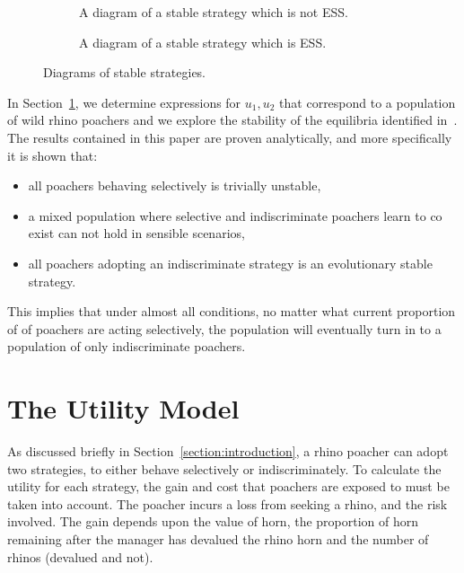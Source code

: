 \documentclass[10pt]{article}
\begin{document}
\begin{figure}[!htbp]
\begin{center}
    \begin{subfigure}{0.40\textwidth}
    
    \caption{\label{fig:stable_diagram} A diagram of a stable strategy which 
    is not ESS.}
    \end{subfigure}
    \begin{subfigure}{0.40\textwidth}
    
    \caption{\label{fig:ess_diagram}A diagram of a stable strategy which is ESS.}
    \end{subfigure}
        \caption{\label{fig:stable_ess_driagrams} Diagrams of stable strategies.}
\end{center}
\end{figure}

In Section~\ref{section:the_model}, we determine expressions
for \(u_1, u_2\) that correspond to a population of wild rhino poachers and we
explore the stability of the equilibria identified in~\cite{Lee}. The results
contained in this paper are proven analytically, and more specifically it is 
shown that:

\begin{itemize}
    \item all poachers behaving selectively is trivially unstable,  
    \item a mixed population where selective and indiscriminate poachers
          learn to co exist can not hold in sensible scenarios,
    \item all poachers adopting an indiscriminate strategy is an evolutionary 
          stable strategy.
\end{itemize}

This implies that under almost all conditions, no matter what current proportion 
of
of poachers are acting selectively, the population will eventually turn in to a 
population of only indiscriminate poachers.

\section{The Utility Model}\label{section:the_model}

As discussed briefly in Section~\ref{section:introduction}, a rhino poacher
can adopt two strategies, to either behave selectively
or indiscriminately. To calculate the utility for each strategy, the gain and cost
that poachers are exposed to must be taken into account. The poacher incurs a
loss from seeking a rhino, and the risk involved. The gain depends upon the value
of horn, the proportion of horn remaining after the manager has devalued the 
rhino horn and the number of rhinos (devalued and not).
\end{document}
